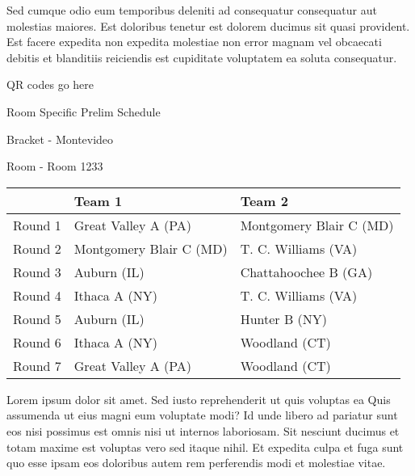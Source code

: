 \documentclass{article}%
\begin{document}
\newline%
Sed cumque odio eum temporibus deleniti ad consequatur consequatur aut molestias maiores. Est doloribus tenetur est dolorem ducimus sit quasi provident. Est facere expedita non expedita molestiae non error magnam vel obcaecati debitis et blanditiis reiciendis est cupiditate voluptatem ea soluta consequatur.%
\vspace*{140pt}%
\begin{center}%
\begin{Huge}%
QR codes go here%
\end{Huge}%
\end{center}%
\newpage%
\begin{center}%
\begin{Huge}%
Room Specific Prelim Schedule%
\end{Huge}%
\vspace*{8pt}%
\linebreak%
\begin{Large}%
Bracket {-} Montevideo%
\end{Large}%
\vspace*{8pt}%
\linebreak%
\vspace*{8pt}%
\begin{Large}%
Room {-} Room 1233%
\end{Large}%
\end{center}%
%
\begin{tabularx}{\textwidth}{|c|Y|Y|}%
\hline%
&Team 1&Team 2\\%
\hline%
Round 1&Great Valley A (PA)&Montgomery Blair C (MD)\\%
Round 2&Montgomery Blair C (MD)&T. C. Williams (VA)\\%
Round 3&Auburn (IL)&Chattahoochee B (GA)\\%
Round 4&Ithaca A (NY)&T. C. Williams (VA)\\%
Round 5&Auburn (IL)&Hunter B (NY)\\%
Round 6&Ithaca A (NY)&Woodland (CT)\\%
Round 7&Great Valley A (PA)&Woodland (CT)\\%
\hline%
\end{tabularx}%
\vspace*{8pt}%
\newline%
Lorem ipsum dolor sit amet. Sed iusto reprehenderit ut quis voluptas ea Quis assumenda ut eius magni eum voluptate modi? Id unde libero ad pariatur sunt eos nisi possimus est omnis nisi ut internos laboriosam. Sit nesciunt ducimus et totam maxime est voluptas vero sed itaque nihil. Et expedita culpa et fuga sunt quo esse ipsam eos doloribus autem rem perferendis modi et molestiae vitae.\newline%
\end{document}
